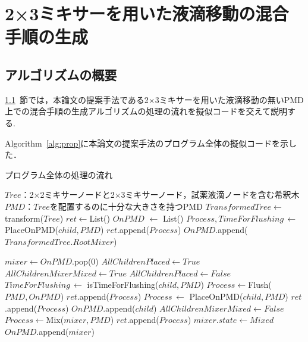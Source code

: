 \chapter{{2×3ミキサーを用いた液滴移動の混合手順の生成}}
\section{アルゴリズムの概要}
\label{overview}
\ref{overview}~節では，本論文の提案手法である2$\times$3ミキサーを用いた液滴移動の無いPMD上での混合手順の生成アルゴリズムの処理の流れを擬似コードを交えて説明する.

Algorithm~\ref{alg:prop}に本論文の提案手法のプログラム全体の擬似コードを示した．


\begin{algorithm}[tbp]
 \caption{プログラム全体の処理の流れ}\label{alg:prop}
 \begin{algorithmic}[1]
    \Require $\mathit{Tree}$：2$\times$2ミキサーノードと2$\times$3ミキサーノード，試薬液滴ノードを含む希釈木
     \Require $\mathit{PMD}$：$\mathit{Tree}$を配置するのに十分な大きさを持つPMD  
     \State $\mathit{TransformedTree} \gets$ transform($Tree$) 
     \State $\mathit{ret} \gets $List() 
     \State $\mathit{OnPMD}$ $\gets$ List() 
     \State $\mathit{Process,TimeForFlushing}\,\gets $  PlaceOnPMD($\mathit{child,PMD}$)
     \State $\mathit{ret}$.append($\mathit{Process}$)
     \State $\mathit{OnPMD}$.append($TransformedTree.RootMixer$)
    
    \State {}
        \State$\mathit{mixer} \gets  \mathit{OnPMD}$.pop(0)
        \State $\mathit{AllChildrenPlaced}\gets\mathit{True}$
        \State $\mathit{AllChildrenMixerMixed}\gets\mathit{True}$
                \State$\mathit{AllChildrenPlaced \gets False}$
                \State $\mathit{TimeForFlushing}\, \gets$  isTimeForFlushing($\mathit{child,PMD}$) 
                    \State $\mathit{Process}\gets$Flush($\mathit{PMD,OnPMD}$)
                    \State $\mathit{ret}$.append($\mathit{Process}$)
                \EndIf
                \State $\mathit{Process}\, \gets$  PlaceOnPMD($\mathit{child,PMD}$)
                \State $\mathit{ret}$.append($\mathit{Process}$)
                \State $\mathit{OnPMD}$.append($\mathit{child}$) 
            \EndIf 
                \State $\mathit{AllChildrenMixerMixed}\gets\mathit{False}$
            \EndIf 
        \EndFor 
            \State$\mathit{Process}\gets$Mix($\mathit{mixer,PMD}$)
            \State $\mathit{ret}$.append($\mathit{Process}$)
            \State$\mathit{mixer.state} \gets \mathit{Mixed}$ 
        \EndIf
        \State$\mathit{OnPMD}$.append($\mathit{mixer}$)
    \EndWhile 


\end{algorithmic}
\end{algorithm}
